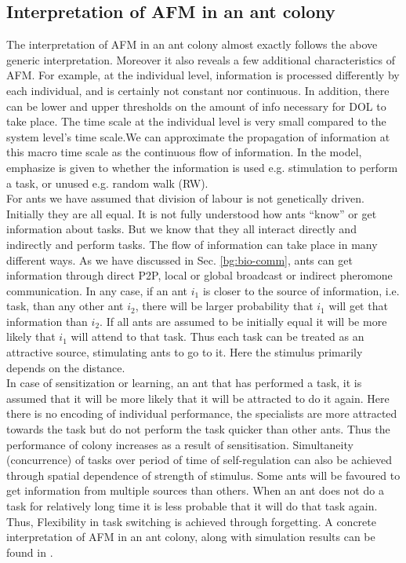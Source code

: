  \subsection{Interpretation of AFM  in an ant colony}
 The interpretation of AFM in an ant colony almost exactly follows the above generic interpretation. Moreover it also reveals a few additional characteristics of AFM. For example, at the individual level, information is processed differently by each individual, and is certainly not constant nor continuous. In addition, there can be lower and upper thresholds on the amount of info necessary for DOL to take place. The time scale at the individual level is very small compared to the system level's time scale.We can approximate the propagation of information at this macro time scale as the continuous flow of information.  In the model, emphasize is given to whether the information is used e.g. stimulation to perform a task, or unused e.g. random walk (RW).\\
For ants we have assumed that division of labour is not genetically driven. Initially they are all equal. It is not fully understood how ants ``know'' or get information about tasks. But we know that they all interact directly and indirectly and perform tasks. The flow of information can take place in many different ways. As we have discussed in Sec. \ref{bg:bio-comm}, ants can get information through direct P2P, local or global broadcast or indirect pheromone communication. In any case, if an ant $i_{1}$ is closer to the source of information, i.e. task, than any other ant $i_{2}$, there will be larger probability that $i_{1}$ will get that information than $i_{2}$. If all ants are assumed to be initially equal it will be more likely that  $i_{1}$ will attend to that task. Thus each task can be  treated as an attractive source,  stimulating ants to go to it. Here the stimulus primarily depends on the distance.\\
 In case of sensitization or learning, an ant that has performed a task, it is assumed that it will be more likely that it will be attracted to do it again. Here there is no encoding of individual performance, the specialists are more attracted towards the task but do not perform  the task quicker than other ants. Thus the performance of colony increases as a result of sensitisation. Simultaneity (concurrence) of tasks over period of time of self-regulation can also be achieved through spatial dependence of strength of stimulus. Some ants will be favoured to get information from multiple sources than others. When an ant does not do a task for relatively long time it is less probable that it will do that task again. Thus, Flexibility in task switching is achieved through forgetting. A concrete interpretation of AFM in an ant colony, along with simulation results can be found in \cite{Arcaute+2008}.
